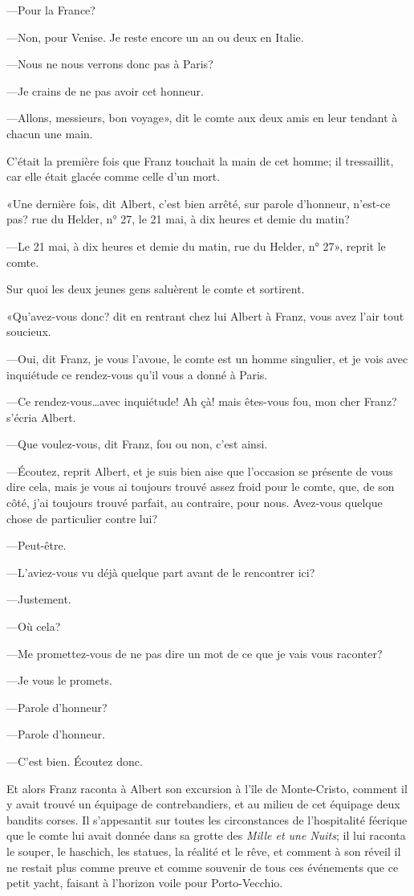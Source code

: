 —Pour la France? 

—Non, pour Venise. Je reste encore un an ou deux en Italie. 

—Nous ne nous verrons donc pas à Paris? 

—Je crains de ne pas avoir cet honneur. 

—Allons, messieurs, bon voyage», dit le comte aux deux amis en leur tendant à chacun une main. 

C'était la première fois que Franz touchait la main de cet homme; il tressaillit, car elle était glacée comme celle d'un mort. 

«Une dernière fois, dit Albert, c'est bien arrêté, sur parole d'honneur, n'est-ce pas? rue du Helder, n° 27, le 21 mai, à dix heures et demie du matin? 

—Le 21 mai, à dix heures et demie du matin, rue du Helder, n° 27», reprit le comte. 

Sur quoi les deux jeunes gens saluèrent le comte et sortirent. 

«Qu'avez-vous donc? dit en rentrant chez lui Albert à Franz, vous avez l'air tout soucieux. 

—Oui, dit Franz, je vous l'avoue, le comte est un homme singulier, et je vois avec inquiétude ce rendez-vous qu'il vous a donné à Paris. 

—Ce rendez-vous\dots avec inquiétude! Ah çà! mais êtes-vous fou, mon cher Franz? s'écria Albert. 

—Que voulez-vous, dit Franz, fou ou non, c'est ainsi. 

—Écoutez, reprit Albert, et je suis bien aise que l'occasion se présente de vous dire cela, mais je vous ai toujours trouvé assez froid pour le comte, que, de son côté, j'ai toujours trouvé parfait, au contraire, pour nous. Avez-vous quelque chose de particulier contre lui? 

—Peut-être. 

—L'aviez-vous vu déjà quelque part avant de le rencontrer ici? 

—Justement. 

—Où cela? 

—Me promettez-vous de ne pas dire un mot de ce que je vais vous raconter? 

—Je vous le promets. 

—Parole d'honneur?  

—Parole d'honneur. 

—C'est bien. Écoutez donc. 

Et alors Franz raconta à Albert son excursion à l'île de Monte-Cristo, comment il y avait trouvé un équipage de contrebandiers, et au milieu de cet équipage deux bandits corses. Il s'appesantit sur toutes les circonstances de l'hospitalité féerique que le comte lui avait donnée dans sa grotte des \textit{Mille et une Nuits}; il lui raconta le souper, le haschich, les statues, la réalité et le rêve, et comment à son réveil il ne restait plus comme preuve et comme souvenir de tous ces événements que ce petit yacht, faisant à l'horizon voile pour Porto-Vecchio.  

